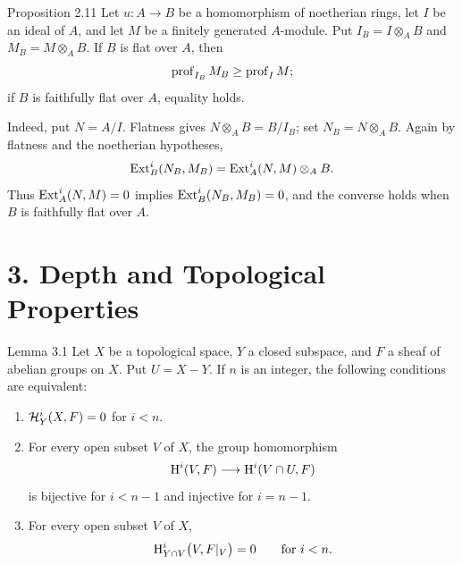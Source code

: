 \begin{sgastatement}{Proposition 2.11}
Let $u:A\to B$ be a homomorphism of noetherian rings, let $I$ be an ideal
of $A$, and let $M$ be a finitely generated $A$-module. Put
$I_B=I\otimes_A B$ and $M_B=M\otimes_A B$. If $B$ is flat over $A$, then
\[
  \operatorname{prof}_{I_B}M_B\ge\operatorname{prof}_I M;
\]
if $B$ is faithfully flat over $A$, equality holds.
\end{sgastatement}

Indeed, put $N=A/I$. Flatness gives $N\otimes_A B=B/I_B$; set
$N_B=N\otimes_A B$. Again by flatness and the noetherian hypotheses,
\[
  \operatorname{Ext}_B^i(N_B,M_B)=\operatorname{Ext}_A^i(N,M)\otimes_A B.
\]
Thus $\operatorname{Ext}_A^i(N,M)=0$ implies $\operatorname{Ext}_B^i(N_B,M_B)=0$, and the converse
holds when $B$ is faithfully flat over $A$.



\section*{3. Depth and Topological Properties}

\begin{sgastatement}{Lemma 3.1}
Let $X$ be a topological space, $Y$ a closed subspace, and $F$ a sheaf of
abelian groups on $X$. Put $U=X-Y$. If $n$ is an integer, the following
conditions are equivalent:
\begin{enumerate}[label=\textup{(\roman*)},leftmargin=2.6em]
\item $\mathcal H_Y^i(X,F)=0$ for $i<n$.
\item For every open subset $V$ of $X$, the group homomorphism
\[
  \mathrm H^i(V,F)\longrightarrow\mathrm H^i(V\cap U,F)
\]
is bijective for $i<n-1$ and injective for $i=n-1$.
\item For every open subset $V$ of $X$,
\[
  \mathrm H_{Y\cap V}^i\bigl(V,F|_V\bigr)=0\qquad\text{for }i<n.
\]
\end{enumerate}
\end{sgastatement}

